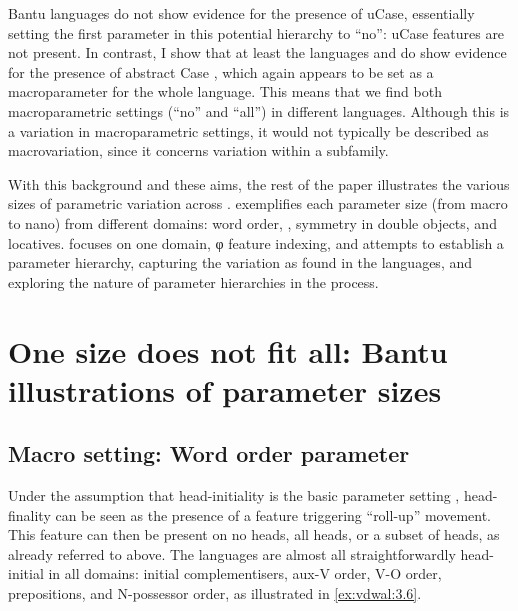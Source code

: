 \documentclass[output=paper]{langsci/langscibook}
\begin{document}
Bantu languages do not show evidence for the presence of
uCase, essentially
setting the first parameter in this potential hierarchy to \enquote{no}: uCase features
are not present. In contrast, I show that at least the  languages 
and  do show evidence for the presence of abstract Case
\parencite{vanderWal2015}, which again appears to be set as a macroparameter
for the whole language. This means that we find both macroparametric settings
(\enquote{no} and \enquote{all}) in different  languages.  Although this is a variation in
macroparametric settings, it would not typically be described as
macrovariation, since it concerns variation within a subfamily.

With this background and these aims, the rest of the paper illustrates the
various sizes of parametric variation across .
 exemplifies each parameter size (from macro to nano) from
different domains: word order, , symmetry in
double objects, and locatives.   focuses on one domain, φ
feature indexing, and attempts to establish a parameter
hierarchy, capturing the variation as found in the
 languages, and exploring the nature of parameter hierarchies in the
process.

\section{One size does not fit all: Bantu illustrations of parameter
sizes}\label{sec:3.2}

\subsection{Macro setting: Word order parameter}\label{sub:3.2.1}

Under the assumption that head-initiality is the basic parameter setting
\citep{Kayne1994}, head-finality can be seen as the presence of a
 feature triggering “roll-up” movement. This
feature can then be present on no heads, all heads, or a subset of heads, as
already referred to above. The  languages are almost all straightforwardly
head-initial in all domains: initial complementisers, aux-V order, V-O order,
prepositions, and N-possessor order, as illustrated in \eqref{ex:vdwal:3.6}.
\end{document}

